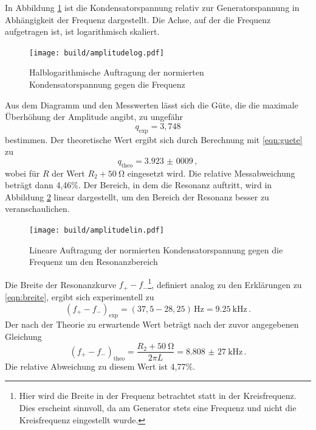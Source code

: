In Abbildung \ref{fig:amplitudelog} ist die Kondensatorspannung relativ
zur Generatorspannung in Abhängigkeit der Frequenz dargestellt. Die Achse, auf der
die Frequenz aufgetragen ist, ist logarithmisch skaliert.

\begin{figure}
  \centering
  \texttt{[image: build/amplitudelog.pdf]}
  \caption{Halblogarithmische Auftragung der normierten Kondensatorspannung gegen die Frequenz}
  \label{fig:amplitudelog}
\end{figure}

Aus dem Diagramm und den Messwerten lässt sich die Güte, die die maximale
Überhöhung der Amplitude angibt, zu ungefähr
\begin{equation*}
  q_\text{exp} = 3,748
\end{equation*}
bestimmen. Der theoretische Wert ergibt sich durch Berechnung mit \eqref{eqn:guete}
zu
\begin{equation*}
  q_\text{theo} = \SI{3,923(0009)}\,,
\end{equation*}
wobei für $R$ der Wert $R_2+\SI{50}{\ohm}$ eingesetzt wird.
Die relative Messabweichung beträgt dann 4,46\%.
Der Bereich, in dem die Resonanz auftritt, wird in Abbildung \ref{fig:amplitudelin}
linear dargestellt, um den Bereich der Resonanz besser zu veranschaulichen.

\begin{figure}
  \centering
  \texttt{[image: build/amplitudelin.pdf]}
  \caption{Lineare Auftragung der normierten Kondensatorspannung gegen die Frequenz um den Resonanzbereich}
  \label{fig:amplitudelin}
\end{figure}

Die Breite der Resonanzkurve $f_{+} - f_{-}$\footnote{Hier wird die Breite in der
Frequenz betrachtet statt in der Kreisfrequenz. Dies erscheint sinnvoll, da am
Generator stets eine Frequenz und nicht die Kreisfrequenz eingestellt wurde.},
definiert analog zu den Erklärungen zu \eqref{eqn:breite}, ergibt sich experimentell zu
\begin{equation*}
  (f_{+} - f_{-})_\text{exp} = (37,5-28,25)\,\text{Hz} = \SI{9,25}{\kilo\hertz}\,.
\end{equation*}
Der nach der Theorie zu erwartende Wert beträgt nach der zuvor angegebenen Gleichung
\begin{equation*}
  (f_{+} - f_{-})_\text{theo} = \frac{R_2+\SI{50}{\ohm}}{2\pi L} = \SI{8,808(27)}{\kilo\hertz}\,.
\end{equation*}
Die relative Abweichung zu diesem Wert ist 4,77\%.


